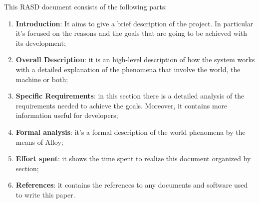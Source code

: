 \renewcommand{\arraystretch}{1.6}
This RASD document consists of the following parts:
\begin{enumerate}
    \item \textbf{Introduction}: It aims to give a brief description of the project. In particular
    it’s focused on the reasons and the goals that are going to be achieved with its
    development;
    \item \textbf{Overall Description}: it is an high-level description of how the system works with
    a detailed explanation of the phenomena that involve the world, the machine or
    both;
    \item \textbf{Specific Requirements}: in this section there is a detailed analysis of the requirements
    needed to achieve the goals. Moreover, it contains more information useful for
    developers;
    \item \textbf{Formal analysis}: it’s a formal description of the world phenomena by the means
    of Alloy;
    \item \textbf{Effort spent}: it shows the time spent to realize this document organized by section;
    \item \textbf{References}: it contains the references to any documents and software used to write
    this paper.
\end{enumerate}